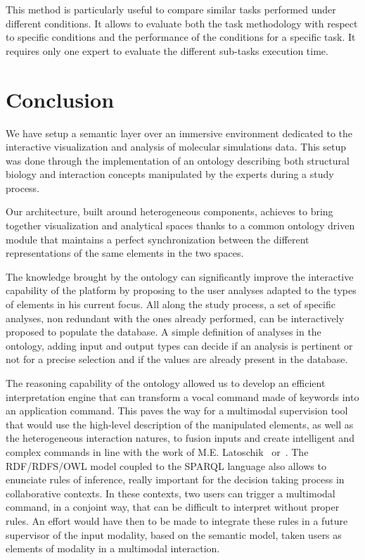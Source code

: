 \documentclass{vgtc}                          %
\begin{document}
This method is particularly useful to compare similar tasks performed under different conditions. It allows to evaluate both the task methodology with respect to specific conditions and the performance of the conditions for a specific task. It requires only one expert to evaluate the different sub-tasks execution time.

\section{Conclusion}

We have setup a semantic layer over an immersive environment dedicated to the interactive visualization and analysis of molecular simulations data. This setup was done through the implementation of an ontology describing both structural biology and interaction concepts manipulated by the experts during a study process.

Our architecture, built around heterogeneous components, achieves to bring together visualization and analytical spaces thanks to a common ontology driven module that maintains a perfect synchronization between the different representations of the same elements in the two spaces.

The knowledge brought by the ontology can significantly improve the interactive capability of the platform by proposing to the user analyses adapted to the types of elements in his current focus. All along the study process, a set of specific analyses, non redundant with the ones already performed, can be interactively proposed to populate the database. A simple definition of analyses in the ontology, adding input and output types can decide if an analysis is pertinent or not for a precise selection and if the values are already present in the database.

The reasoning capability of the ontology allowed us to develop an efficient interpretation engine that can transform a vocal command made of keywords into an application command. This paves the way for a multimodal supervision tool that would use the high-level description of the manipulated elements, as well as the heterogeneous interaction natures, to fusion inputs and create intelligent and complex commands in line with the work of M.E. Latoschik~\cite{Wiebusch:2015aa} or~\cite{gutierrez2005semantics}.
The RDF/RDFS/OWL model coupled to the SPARQL language also allows to enunciate rules of inference, really important for the decision taking process in collaborative contexts. In these contexts, two users can trigger a multimodal command, in a conjoint way, that can be difficult to interpret without proper rules. An effort would have then to be made to integrate these rules in a future supervisor of the input modality, based on the semantic model, taken users as elements of modality in a multimodal interaction.
\end{document}
